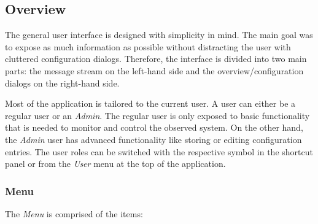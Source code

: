 \documentclass[12pt,a4paper]{scrartcl}
\begin{document}
\subsection{Overview}
\label{subsec:GettingStartedOverview}
The general user interface is designed with simplicity in mind. The main goal was to expose as much information as possible without distracting the user with cluttered configuration dialogs. Therefore, the interface is divided into two main parts: the message stream on the left-hand side and the overview/configuration dialogs on the right-hand side. 

Most of the application is tailored to the current user. A user can either be a regular user or an \textit{Admin}. The regular user is only exposed to basic functionality that is needed to monitor and control the observed system. On the other hand, the \textit{Admin} user has advanced functionality like storing or editing configuration entries. The user roles can be switched with the respective symbol in the shortcut panel or from the \textit{User} menu at the top of the application.

\FloatBarrier
\subsubsection{Menu}
\label{subsubsec:GettingStartedOverviewMenu}
The \textit{Menu} is comprised of the items: 
\end{document}
